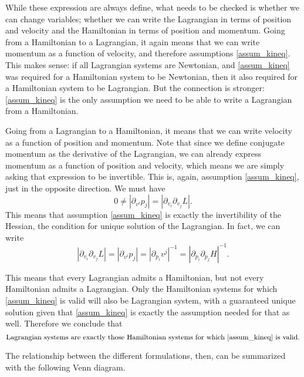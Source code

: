 While these expression are always define, what needs to be checked is whether we can change variables; whether we can write the Lagrangian in terms of position and velocity and the Hamiltonian in terms of position and momentum. Going from a Hamiltonian to a Lagrangian, it again means that we can write momentum as a function of velocity, and therefore assumptions \ref{assum_kineq}. This makes sense: if all Lagrangian systems are Newtonian, and \ref{assum_kineq} was required for a Hamiltonian system to be Newtonian, then it also required for a Hamiltonian system to be Lagrangian. But the connection is stronger: \ref{assum_kineq} is the only assumption we need to be able to write a Lagrangian from a Hamiltonian.

Going from a Lagrangian to a Hamiltonian, it means that we can write velocity as a function of position and momentum. Note that since we define conjugate momentum as the derivative of the Lagrangian, we can already express momentum as a function of position and velocity, which means we are simply asking that expression to be invertible. This is, again, assumption \ref{assum_kineq}, just in the opposite direction. We must have
\begin{equation}
	0 \neq \left| \partial_{v^i} p_j \right| = \left| \partial_{v_i} \partial_{v_j} L \right|.
\end{equation}
This means that assumption \ref{assum_kineq} is exactly the invertibility of the Hessian, the condition for unique solution of the Lagrangian. In fact, we can write
\begin{equation}
	\left| \partial_{v_i} \partial_{v_j} L \right| = \left| \partial_{v^i} p_j \right| = \left| \partial_{p_i} v^j \right|^{-1} = \left|\partial_{p_i}\partial_{p_j} H\right|^{-1}.
\end{equation}

This means that every Lagrangian admits a Hamiltonian, but not every Hamiltonian admits a Lagrangian. Only the Hamiltonian systems for which \ref{assum_kineq} is valid will also be Lagrangian system, with a guaranteed unique solution given that \ref{assum_kineq} is exactly the assumption needed for that as well. Therefore we conclude that
\begin{equation}
	\textrm{Lagrangian systems are exactly those Hamiltonian systems for which \ref{assum_kineq} is valid.}
\end{equation}

The relationship between the different formulations, then, can be summarized with the following Venn diagram.

